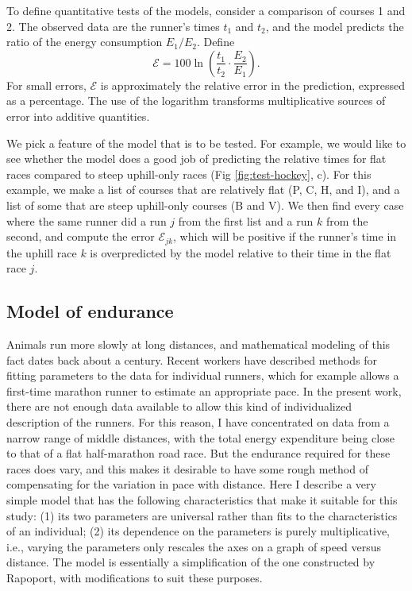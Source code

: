 \documentclass[10pt,letterpaper]{article}
\begin{document}
To define quantitative tests of the models, consider a comparison
of courses 1 and 2. The observed data are the runner's times $t_1$ and $t_2$, and
the model predicts the ratio of the energy consumption $E_1/E_2$. Define
\begin{equation}\label{eq:define-e}
  \mathcal{E} = 100 \ln\left(\frac{t_1}{t_2}\cdot\frac{E_2}{E_1}\right).
\end{equation}
For small errors, $\mathcal{E}$ is approximately the relative error in the prediction, expressed
as a percentage. The use of the logarithm transforms multiplicative sources of
error into additive quantities.

We pick a feature of the model that is to be tested. For example, we would like to see
whether the model does a good job of predicting the relative times for flat races
compared to steep uphill-only races (Fig \ref{fig:test-hockey}, c). For this example, we make a list of courses
that are relatively flat (P, C, H, and I), and a list of some that are steep uphill-only
courses (B and V). We then find every case where the same runner did a run $j$ from the first
list and a run $k$ from the second, and compute the error $\mathcal{E}_{jk}$, which will be
positive if the runner's time in the uphill race $k$ is overpredicted by the model relative
to their time in the flat race $j$.

\subsection{Model of endurance}\label{sec:endurance}

Animals run more slowly at long distances, and mathematical modeling of this fact dates back
about a century.\cite{hill}  Recent workers have described methods for fitting parameters
to the data for individual runners,\cite{rapoport}\cite{emig} which for example allows
a first-time marathon runner to estimate an appropriate pace. In the present work, there are
not enough data available to allow this kind of individualized description of the runners.
For this reason, I have concentrated on data from a narrow range of middle distances,
with the total energy expenditure being close to that of a flat half-marathon road race.
But the endurance required for these races does vary, and this makes it desirable to have
some rough method of compensating for the variation in pace with distance. Here I describe
a very simple model that has the following characteristics that make it suitable for this
study: (1) its two parameters are universal rather than fits to the characteristics of an individual;
(2) its dependence on the parameters is purely multiplicative, i.e., varying the parameters only
rescales the axes on a graph of speed versus distance.
The model is essentially a simplification of the one constructed by Rapoport,\cite{rapoport} with modifications
to suit these purposes.
\end{document}
